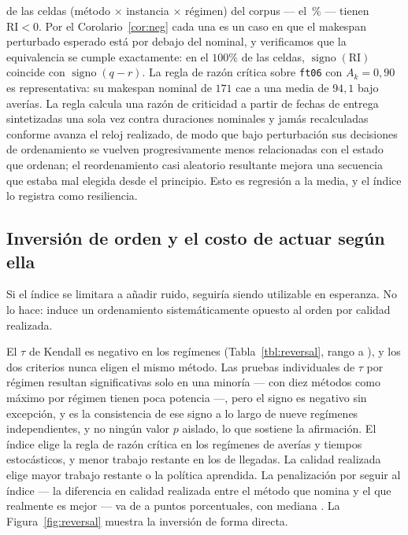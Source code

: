 \documentclass[a4paper,fleqn]{cas-sc}
\newcommand{\RI}{\mathrm{RI}}
\begin{document}
\NRINeg{} de las \PropCells{} celdas (método $\times$ instancia $\times$ régimen)
del corpus --- el \PctRINeg{}\,\% --- tienen $\RI<0$. Por el Corolario~\ref{cor:neg} cada una es un caso en que
el makespan perturbado esperado está por debajo del nominal, y verificamos que
la equivalencia se cumple exactamente: en el $100\%$ de las celdas,
$\operatorname{signo}(\RI)$ coincide con $\operatorname{signo}(q-r)$. La regla de
razón crítica sobre \texttt{ft06} con $A_k=0{,}90$ es representativa: su
makespan nominal de $171$ cae a una media de $94{,}1$ bajo averías. La regla
calcula una razón de criticidad a partir de fechas de entrega sintetizadas una
sola vez contra duraciones nominales y jamás recalculadas conforme avanza el
reloj realizado, de modo que bajo perturbación sus decisiones de ordenamiento se
vuelven progresivamente menos relacionadas con el estado que ordenan; el
reordenamiento casi aleatorio resultante mejora una secuencia que estaba mal
elegida desde el principio. Esto es regresión a la media, y el índice lo
registra como resiliencia.

\subsection{Inversión de orden y el costo de actuar según ella}
\label{sec:res-reversal}

Si el índice se limitara a añadir ruido, seguiría siendo utilizable en
esperanza. No lo hace: induce un ordenamiento sistemáticamente opuesto al orden
por calidad realizada.



El $\tau$ de Kendall es negativo en los \NRegimes{} regímenes
(Tabla~\ref{tbl:reversal}, rango \TauMin{} a \TauMax{}), y los dos criterios
nunca eligen el mismo método. Las pruebas individuales de $\tau$ por régimen
resultan significativas solo en una minoría --- con diez métodos como máximo por
régimen tienen poca potencia ---, pero el signo es negativo sin excepción, y es
la consistencia de ese signo a lo largo de nueve regímenes independientes, y no
ningún valor $p$ aislado, lo que sostiene la afirmación. El índice elige la regla de razón crítica en los
\CRWins{} regímenes de averías y tiempos estocásticos, y menor trabajo restante
en los \LWKRWins{} de llegadas. La calidad realizada elige mayor trabajo
restante o la política aprendida. La penalización por seguir al índice --- la
diferencia en calidad realizada entre el método que nomina y el que realmente es
mejor --- va de \PenaltyMin{} a \PenaltyMax{} puntos porcentuales, con mediana
\PenaltyMedian{}. La Figura~\ref{fig:reversal} muestra la inversión de forma
directa.
\end{document}
